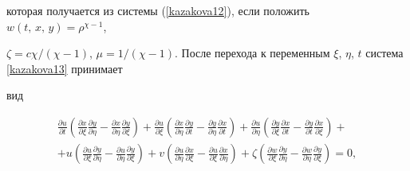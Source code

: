 которая получается из системы (\ref{kazakova12}), если положить $w(t,\,x,\,y)=\rho^{\chi-1}$,

$\zeta=c\chi/(\chi-1)$, $\mu=1/(\chi-1)$. После перехода к переменным $\xi$, $\eta$, $t$ система \eqref{kazakova13} принимает

вид

\begin{multline*}

\frac{\partial u}{\partial t}\left(\frac{\partial x}{\partial \xi} \frac{\partial y}{\partial \eta}-\frac{\partial

x}{\partial \eta}

\frac{\partial y}{\partial \xi} \right) + \frac{\partial u}{\partial \xi} \left(\frac{\partial x}{\partial \eta} \frac{\partial y}{\partial t}

- \frac{\partial y}{\partial \eta} \frac{\partial x}{\partial t}\right) + \frac{\partial u}{\partial \eta} \left(\frac{\partial y }

{\partial \xi} \frac{\partial x}{\partial t} - \frac{\partial y}{\partial t} \frac{\partial x}{\partial \xi} \right)+\\

+u \left(\frac{\partial u}{\partial \xi} \frac{\partial y}{\partial \eta}-\frac{\partial u}{\partial \eta} \frac{\partial y}{\partial \xi} \right) +

v \left(\frac{\partial u}{\partial \eta} \frac{\partial x}{\partial \xi} - \frac{\partial u}{\partial \xi} \frac{\partial x}{\partial \eta} \right) +

\zeta \left(\frac{\partial w}{\partial \xi} \frac{\partial y}{\partial \eta} - \frac{\partial w }{\partial \eta} \frac{\partial y}{\partial \xi} \right)=0,\end{multline*}


